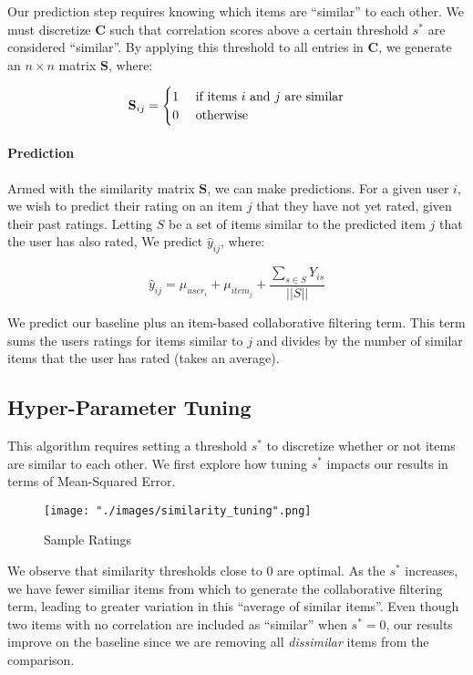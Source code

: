 \documentclass[12pt]{article}
\begin{document}
Our prediction step requires knowing which items are ``similar'' to each other. We must discretize $\mathbf{C}$ such that correlation scores above a certain threshold $s^*$ are considered ``similar''.\textsuperscript{\cite{sarwar}} By applying this threshold to all entries in $\mathbf{C}$, we generate an $n \times n$ matrix $\mathbf{S}$, where:

$$
\mathbf{S}_{ij} =
\begin{cases}
    \hfill 1    \hfill & \text{ if items $i$ and $j$ are similar} \\
    \hfill 0    \hfill & \text{ otherwise} \\
\end{cases}
$$

\paragraph{Prediction} Armed with the similarity matrix $\mathbf{S}$, we can make predictions. For a given user $i$, we wish to predict their rating on an item $j$ that they have not yet rated, given their past ratings. Letting $S$ be a set of items similar to the predicted item $j$ that the user has also rated, We predict $\hat y_{ij}$, where:

$$ \hat y_{ij} = \mu_{user_i} + \mu_{item_j} + \frac{\sum_{s \in S} Y_{is}}{||S||}$$

We predict our baseline plus an item-based collaborative filtering term.\textsuperscript{\cite{gower}} This term sums the users ratings for items similar to $j$ and divides by the number of similar items that the user has rated (takes an average).

\subsection*{Hyper-Parameter Tuning}
This algorithm requires setting a threshold $s^*$ to discretize whether or not items are similar to each other. We first explore how tuning $s^*$ impacts our results in terms of Mean-Squared Error.

\begin{figure}[!ht]
\begin{center}
\caption{Sample Ratings}
    \texttt{[image: "./images/similarity\_tuning".png]}
\end{center}
\end{figure}

We observe that similarity thresholds close to $0$ are optimal. As the $s^*$ increases, we have fewer similiar items from which to generate the collaborative filtering term, leading to greater variation in this ``average of similar items''. Even though two items with no correlation are included as ``similar'' when $s^* = 0$, our results improve on the baseline since we are removing all \textit{dissimilar} items from the comparison.
\end{document}
